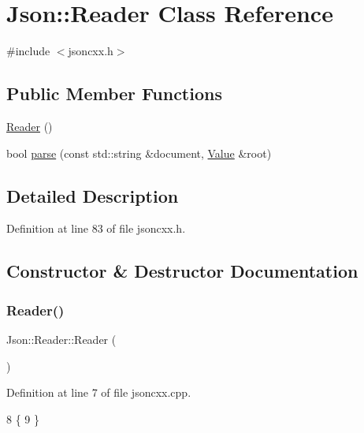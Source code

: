 \hypertarget{class_json_1_1_reader}{}\section{Json\+:\+:Reader Class Reference}
\label{class_json_1_1_reader}


{\ttfamily \#include $<$jsoncxx.\+h$>$}

\subsection*{Public Member Functions}
\begin{DoxyCompactItemize}
\item 
\hyperlink{class_json_1_1_reader_a0b3c4e24c8393354bab57a6ba3ffc27f}{Reader} ()
\item 
bool \hyperlink{class_json_1_1_reader_ada62b16488d21737bcf87a31ce5281d6}{parse} (const std\+::string \&document, \hyperlink{class_json_1_1_value}{Value} \&root)
\end{DoxyCompactItemize}


\subsection{Detailed Description}


Definition at line 83 of file jsoncxx.\+h.



\subsection{Constructor \& Destructor Documentation}
\mbox{\label{class_json_1_1_reader_a0b3c4e24c8393354bab57a6ba3ffc27f}} 
\subsubsection{\texorpdfstring{Reader()}{Reader()}}
{\footnotesize\ttfamily Json\+::\+Reader\+::\+Reader (\begin{DoxyParamCaption}{ }\end{DoxyParamCaption})}



Definition at line 7 of file jsoncxx.\+cpp.


\begin{DoxyCode}
8     \{
9     \}
\end{DoxyCode}


